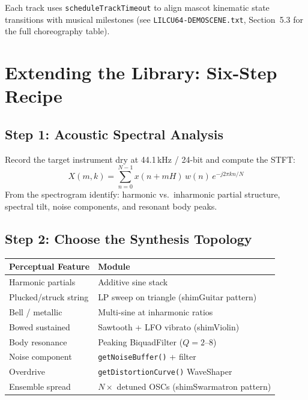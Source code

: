 \documentclass[10pt,journal,compsoc,twocolumn]{article}
\begin{document}
Each track uses \texttt{scheduleTrackTimeout} to align mascot kinematic
state transitions with musical milestones (see \texttt{LILCU64-DEMOSCENE.txt},
Section~5.3 for the full choreography table).

\section{Extending the Library: Six-Step Recipe}
\label{sec:extension}

\subsection{Step 1: Acoustic Spectral Analysis}

Record the target instrument dry at 44.1\,kHz / 24-bit and compute the STFT:
\begin{equation}
X(m,k) = \sum_{n=0}^{N-1} x(n+mH)\,w(n)\,e^{-j2\pi kn/N}
\label{eq:stft}
\end{equation}
From the spectrogram identify: harmonic vs.\ inharmonic partial structure,
spectral tilt, noise components, and resonant body peaks.

\subsection{Step 2: Choose the Synthesis Topology}

\begin{center}
\scriptsize
\begin{tabular}{@{}ll@{}}
\toprule
Perceptual Feature & Module \\
\midrule
Harmonic partials & Additive sine stack \\
Plucked/struck string & LP sweep on triangle (shimGuitar pattern) \\
Bell / metallic & Multi-sine at inharmonic ratios \\
Bowed sustained & Sawtooth + LFO vibrato (shimViolin) \\
Body resonance & Peaking BiquadFilter ($Q=2$--$8$) \\
Noise component & \texttt{getNoiseBuffer()} + filter \\
Overdrive & \texttt{getDistortionCurve()} WaveShaper \\
Ensemble spread & $N\times$ detuned OSCs (shimSwarmatron pattern) \\
\bottomrule
\end{tabular}
\end{center}
\end{document}
